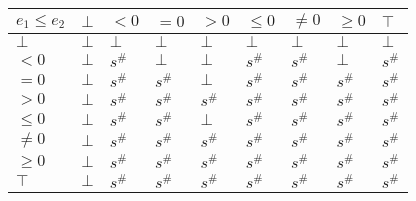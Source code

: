 \documentclass{article}
\begin{document}
                        \begin{table}[]
                            \begin{tabular}{|l|l|l|l|l|l|l|l|l|}
                            \hline
                            $e_1 \le e_2$ & $\bot$ & $<0$   & $=0$   & $>0$   & $\le 0$ & $\ne 0$ & $\ge 0$ & $\top$ \\ \hline
                            $\bot$        & $\bot$ & $\bot$ & $\bot$ & $\bot$ & $\bot$  & $\bot$  & $\bot$  & $\bot$ \\ \hline
                            $<0$          & $\bot$ & $s^\#$ & $\bot$ & $\bot$ & $s^\#$  & $s^\#$  & $\bot$  & $s^\#$ \\ \hline
                            $=0$          & $\bot$ & $s^\#$ & $s^\#$ & $\bot$ & $s^\#$  & $s^\#$  & $s^\#$  & $s^\#$ \\ \hline
                            $>0$          & $\bot$ & $s^\#$ & $s^\#$ & $s^\#$ & $s^\#$  & $s^\#$  & $s^\#$  & $s^\#$ \\ \hline
                            $\le 0$       & $\bot$ & $s^\#$ & $s^\#$ & $\bot$ & $s^\#$  & $s^\#$  & $s^\#$  & $s^\#$ \\ \hline
                            $\ne 0$       & $\bot$ & $s^\#$ & $s^\#$ & $s^\#$ & $s^\#$  & $s^\#$  & $s^\#$  & $s^\#$ \\ \hline
                            $\ge 0$       & $\bot$ & $s^\#$ & $s^\#$ & $s^\#$ & $s^\#$  & $s^\#$  & $s^\#$  & $s^\#$ \\ \hline
                            $\top$        & $\bot$ & $s^\#$ & $s^\#$ & $s^\#$ & $s^\#$  & $s^\#$  & $s^\#$  & $s^\#$ \\ \hline
                            \end{tabular}
                            \end{table}
\end{document}
